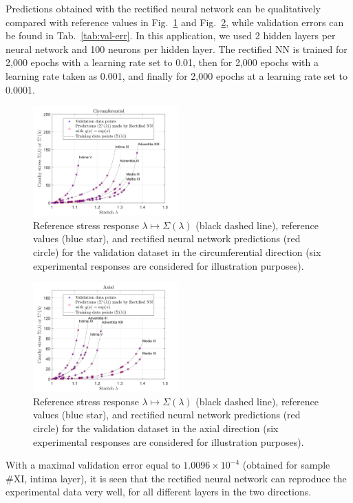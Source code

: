 Predictions obtained with the rectified neural network can be qualitatively compared with reference values in Fig.~\ref{fig:exp_circ} and Fig.~\ref{fig:exp_axial}, while validation errors can be found in Tab.~\ref{tab:val-err}. In this application, we used 2 hidden layers per neural network and 100 neurons per hidden layer. The rectified NN is trained for 2,000 epochs with a learning rate set to 0.01, then for 2,000 epochs with a learning rate taken as 0.001, and finally for 2,000 epochs at a learning rate set to 0.0001. 
\begin{figure}[ht!]
    \begin{center}
        \includegraphics[width=0.5\textwidth]{Pictures/circ.png}
    \end{center}
    \caption[Reference stress response $\lambda \mapsto \Sigma(\lambda)$, reference values, and rectified neural network predictions in the circumferential direction.]{Reference stress response $\lambda \mapsto \Sigma(\lambda)$ (black dashed line), reference values (blue star), and rectified neural network predictions (red circle) for the validation dataset in the circumferential direction (six experimental responses are considered for illustration purposes).}
    \label{fig:exp_circ}
\end{figure}
\begin{figure}[ht!]
    \begin{center}
        \includegraphics[width=0.5\textwidth]{Pictures/axial.png}
    \end{center}
    \caption[Reference stress response $\lambda \mapsto \Sigma(\lambda)$, reference values, and rectified neural network predictions in the axial direction.]{Reference stress response $\lambda \mapsto \Sigma(\lambda)$ (black dashed line), reference values (blue star), and rectified neural network predictions (red circle) for the validation dataset in the axial direction (six experimental responses are considered for illustration purposes).}
    \label{fig:exp_axial}
\end{figure}
With a maximal validation error equal to $1.0096\times10^{-4}$ (obtained for sample \#XI, intima layer), it is seen that the rectified neural network can reproduce the experimental data very well, for all different layers in the two directions.

